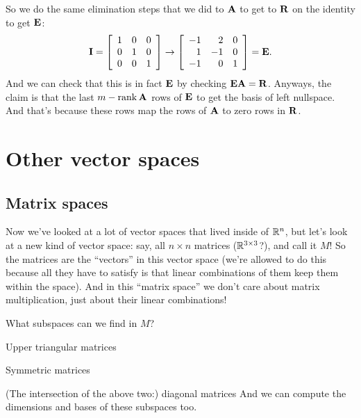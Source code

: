 So we do the same elimination steps that we did to $\boldsymbol{\mathbf{A}}$ to get to $\boldsymbol{\mathbf{R}}$ on the identity to get $\boldsymbol{\mathbf{E}}$:
\[ \boldsymbol{\mathbf{I}} = \left[ \begin{array}{rrrrrrrrrrrrrrrrrrrrrrrrr} 1&0&0\\0&1&0\\0&0&1\\ \end{array} \right] \rightarrow \left[ \begin{array}{rrrrrrrrrrrrrrrrrrrrrrrrr} -1&2&0\\1&-1&0\\-1&0&1\\ \end{array} \right] = \boldsymbol{\mathbf{E}}. \]
And we can check that this is in fact $\boldsymbol{\mathbf{E}}$ by checking $\boldsymbol{\mathbf{E}}\boldsymbol{\mathbf{A}} = \boldsymbol{\mathbf{R}}$. Anyways, the claim is that the last $m-\mathrm{rank}\,\boldsymbol{\mathbf{A}}$ rows of $\boldsymbol{\mathbf{E}}$ to get the basis of left nullspace. And that's because these rows map the rows of $\boldsymbol{\mathbf{A}}$ to zero rows in $\boldsymbol{\mathbf{R}}$.
\eex

\section{Other vector spaces}

\subsection{Matrix spaces}

Now we've looked at a lot of vector spaces that lived inside of $\mathbb{R}^n$, but let's look at a new kind of vector space: say, all $n \times n$ matrices ($\mathbb{R}^{3\times 3}$?), and call it $M$! So the matrices are the ``vectors'' in this vector space (we're allowed to do this because all they have to satisfy is that linear combinations of them keep them within the space). And in this ``matrix space'' we don't care about matrix multiplication, just about their linear combinations!

What subspaces can we find in $M$?
\bit
\item Upper triangular matrices
\item Symmetric matrices
\item (The intersection of the above two:) diagonal matrices
\eit
And we can compute the dimensions and bases of these subspaces too. 

